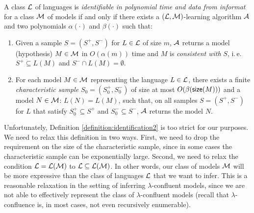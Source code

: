 \begin{definition}\label{definition:identification2}
A class $\textup{\sf $\mathcal{L}$}$ of languages is \emph{identifiable in polynomial time and data from informat} for a class $\textup{\sf $\mathcal{M}$}$ of models if and only if there exists a $(\textup{\sf $\mathcal{L}$}, \textup{\sf $\mathcal{M}$})$-learning algorithm $\textup{\sf $\mathcal{A}$}$ and two polynomials $\alpha(\cdot)$ and $\beta(\cdot)$ such that:
\begin{enumerate}
\item\label{polynomial1} Given a sample $S = (S^+, S^-)$ for $L \in \textup{\sf $\mathcal{L}$}$ of size $m$, $\textup{\sf $\mathcal{A}$}$ returns a model (hypothesis) $M \in \textup{\sf $\mathcal{M}$}$ in $O(\alpha(m))$ time and $M$ is \emph{consistent with} $S$, i.\,e.\ $S^+ \subseteq L(M)$ and $S^- \cap L(M) = \emptyset$.

\item\label{polynomial2} For each model $M \in \textup{\sf $\mathcal{M}$}$ representing the language $L \in \textup{\sf $\mathcal{L}$}$, there exists a finite \emph{characteristic sample} $S_0 = (S_0^+, S_0^-)$ of size at most $O(\beta(\textup{\sf size}(M)))$ and a model $N \in \textup{\sf $\mathcal{M}$}$: $L(N) = L(M)$, such that, on all samples $S = (S^+, S^-)$ for $L$ that satisfy $S_0^+ \subseteq S^+$ and $S_0^- \subseteq S^-$, $\textup{\sf $\mathcal{A}$}$ returns the model $N$.
\end{enumerate}
\end{definition}

Unfortunately, Definition \ref{definition:identification2} is too strict for our purposes. We need to relax this definition in two ways. First, we need to drop the requirement on the size of the characteristic sample, since in some cases the characteristic sample can be exponentially large. Second, we need to relax the condition $\textup{\sf $\mathcal{L}$} = {\cal L}(\textup{\sf $\mathcal{M}$})$ to $\textup{\sf $\mathcal{L}$} \subseteq {\cal L}(\textup{\sf $\mathcal{M}$})$. In other words, our class of models $\textup{\sf $\mathcal{M}$}$ will be more expressive than the class of languages $\textup{\sf $\mathcal{L}$}$ that we want to infer. This is a reasonable relaxation in the setting of inferring $\lambda$-confluent models, since we are not able to effectively represent the class of $\lambda$-confluent models (recall that $\lambda$-confluence is, in most cases, not even recursively enumerable).

